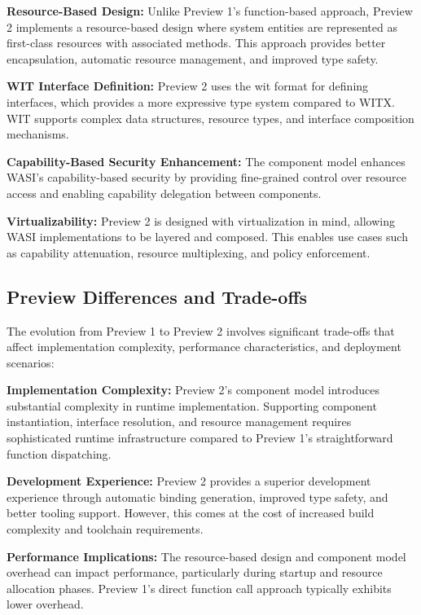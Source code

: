 \textbf{Resource-Based Design:} Unlike Preview 1's function-based approach, Preview 2 implements a resource-based design where system entities are represented as first-class resources with associated methods. This approach provides better encapsulation, automatic resource management, and improved type safety.

\textbf{WIT Interface Definition:} Preview 2 uses the \acrfull{wit} format for defining interfaces, which provides a more expressive type system compared to WITX. WIT supports complex data structures, resource types, and interface composition mechanisms.

\textbf{Capability-Based Security Enhancement:} The component model enhances WASI's capability-based security by providing fine-grained control over resource access and enabling capability delegation between components.

\textbf{Virtualizability:} Preview 2 is designed with virtualization in mind, allowing WASI implementations to be layered and composed. This enables use cases such as capability attenuation, resource multiplexing, and policy enforcement.

\subsection{Preview Differences and Trade-offs}
\label{subsec:preview-differences}

The evolution from Preview 1 to Preview 2 involves significant trade-offs that affect implementation complexity, performance characteristics, and deployment scenarios:

\textbf{Implementation Complexity:} Preview 2's component model introduces substantial complexity in runtime implementation. Supporting component instantiation, interface resolution, and resource management requires sophisticated runtime infrastructure compared to Preview 1's straightforward function dispatching.

\textbf{Development Experience:} Preview 2 provides a superior development experience through automatic binding generation, improved type safety, and better tooling support. However, this comes at the cost of increased build complexity and toolchain requirements.

\textbf{Performance Implications:} The resource-based design and component model overhead can impact performance, particularly during startup and resource allocation phases. Preview 1's direct function call approach typically exhibits lower overhead.

